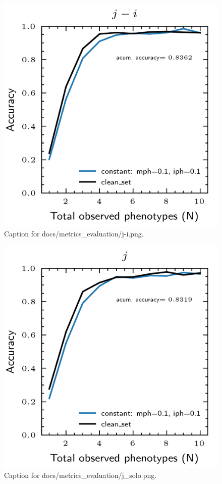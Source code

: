 \documentclass{article}
\begin{document}
\begin{figure}[h] \centering \includegraphics{docs/metrics_evaluation/j-i.png} \caption{Caption for docs/metrics_evaluation/j-i.png.} \end{figure}
\begin{figure}[h] \centering \includegraphics{docs/metrics_evaluation/j_solo.png} \caption{Caption for docs/metrics_evaluation/j_solo.png.} \end{figure}
\end{document}
